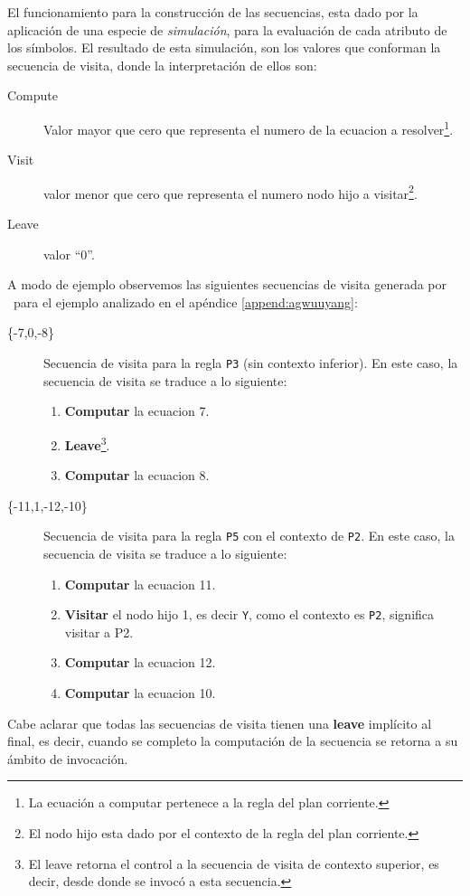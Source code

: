 El funcionamiento para la construcción de las secuencias, esta dado por la aplicación de una especie de \textit{simulación}, para la evaluación de cada atributo de los símbolos. El resultado de esta simulación, son los valores que conforman la secuencia de visita, donde la interpretación de ellos son: 
\begin{description}
\item [Compute] Valor mayor que cero que representa el numero de la ecuacion a resolver\footnote{La ecuación a computar pertenece a la regla del plan corriente.}.
\item [Visit] valor menor que cero que representa el numero nodo hijo a visitar\footnote{El nodo hijo esta dado por el contexto de la regla del plan corriente.}.
\item [Leave] valor ``0''.
\end{description}
A modo de ejemplo observemos las siguientes secuencias de visita generada por \maggen\ para el ejemplo analizado en el apéndice \ref{append:agwuuyang}:
\begin{description}
\item [\{-7,0,-8\}] Secuencia de visita para la regla \texttt{P3} (sin contexto inferior). En este caso, la secuencia de visita se traduce a lo siguiente:
\begin{enumerate}
\item \textbf{Computar} la ecuacion 7.
\item \textbf{Leave}\footnote{El leave retorna el control a la secuencia de visita de contexto superior, es decir, desde donde se invocó a esta secuencia.}.
\item \textbf{Computar} la ecuacion 8.
\end{enumerate}

\item [\{-11,1,-12,-10\}] Secuencia de visita para la regla \texttt{P5} con el contexto de \texttt{P2}. En este caso, la secuencia de visita se traduce a lo siguiente:
\begin{enumerate}
\item \textbf{Computar} la ecuacion 11.
\item \textbf{Visitar} el nodo hijo 1, es decir \texttt{Y}, como el contexto es \texttt{P2}, significa visitar a P2.
\item \textbf{Computar} la ecuacion 12.
\item \textbf{Computar} la ecuacion 10.
\end{enumerate}

\end{description}
Cabe aclarar que todas las secuencias de visita tienen una \textbf{leave} implícito al final, es decir, cuando se completo la computación de la secuencia se retorna a su ámbito de invocación.

